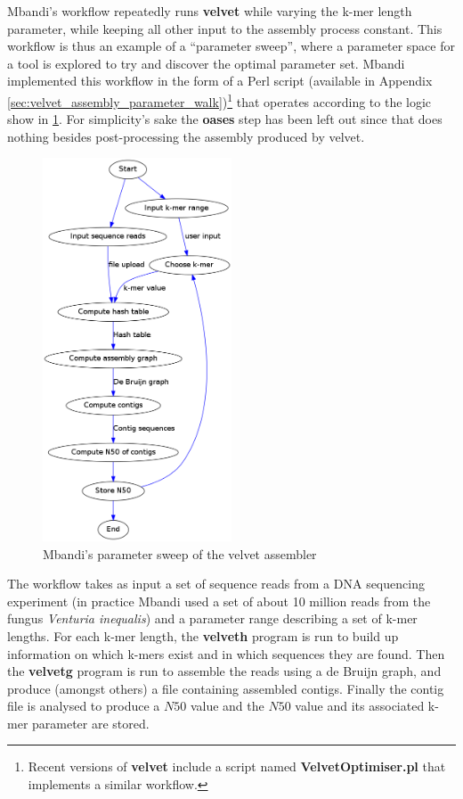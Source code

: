 \documentclass[a4paper,10pt]{scrreprt} \usepackage[utf8]{inputenc}
\begin{document}
Mbandi's workflow repeatedly runs \textbf{velvet} while varying the k-mer length
parameter, while keeping all other input to the assembly process constant. This
workflow is thus an example of a ``parameter sweep'', where a parameter space
for a tool is explored to try and discover the optimal parameter set. Mbandi
implemented this workflow in the form of a Perl script (available in Appendix
\ref{sec:velvet_assembly_parameter_walk})\footnote{Recent versions of
\textbf{velvet} include a script named \textbf{VelvetOptimiser.pl} that
implements a similar workflow.} that operates according to the logic show in
\ref{fig:oases_parameter_walk}. For simplicity's sake the \textbf{oases} step
has been left out since that does nothing besides post-processing the assembly
produced by velvet.

\begin{figure}[!htb] \centering
\includegraphics[width=0.5\textwidth]{images/oases_parameter_walk}
\caption{Mbandi's parameter sweep of the velvet assembler}
\label{fig:oases_parameter_walk}
\end{figure}

The workflow takes as input a set of sequence reads from a DNA sequencing
experiment (in practice Mbandi used a set of about 10 million reads from the
fungus \emph{Venturia inequalis}) and a parameter range describing a set of
k-mer lengths. For each k-mer length, the \textbf{velveth} program is run to
build up information on which k-mers exist and in which sequences they are
found. Then the \textbf{velvetg} program is run to assemble the reads using a de
Bruijn graph, and produce (amongst others) a file containing assembled contigs.
Finally the contig file is analysed to produce a $N50$ value and the $N50$ value
and its associated k-mer parameter are stored.
\end{document}
